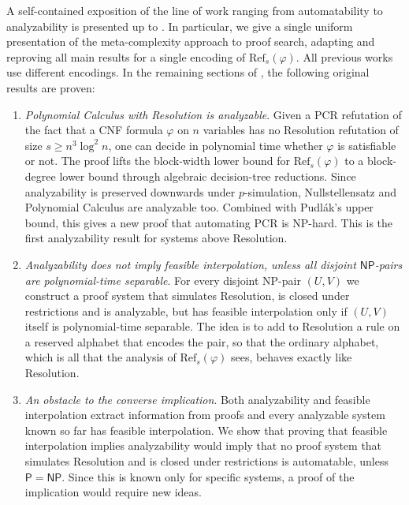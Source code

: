 A self-contained exposition of the line of work ranging from automatability to analyzability is presented up to . In particular, we give a single uniform presentation of the meta-complexity approach to proof search, adapting and reproving all main results for a single encoding of $\mathrm{Ref}_s(\varphi)$. All previous works \cite{res_nphard,alg_nphard,pap,pap_2} use different encodings. In the remaining sections of , the following original results are proven:
\begin{enumerate}
    \item \textit{Polynomial Calculus with Resolution is analyzable}. Given a PCR refutation of the fact that a CNF formula $\varphi$ on $n$ variables has no Resolution refutation of size $s \geq n^3 \log^2 n$, one can decide in polynomial time whether $\varphi$ is satisfiable or not. The proof lifts the block-width lower bound for $\mathrm{Ref}_s(\varphi)$ to a block-degree lower bound through algebraic decision-tree reductions. Since analyzability is preserved downwards under $p$-simulation, Nullstellensatz and Polynomial Calculus are analyzable too. Combined with Pudlák's upper bound, this gives a new proof that automating PCR is $\mathrm{NP}$-hard. This is the first analyzability result for systems above Resolution.
    
    \item \textit{Analyzability does not imply feasible interpolation, unless all disjoint $\mathsf{NP}$-pairs are polynomial-time separable}. For every disjoint $\mathrm{NP}$-pair $(U, V)$ we construct a proof system that simulates Resolution, is closed under restrictions and is analyzable, but has feasible interpolation only if $(U, V)$ itself is polynomial-time separable. The idea is to add to Resolution a rule on a reserved alphabet that encodes the pair, so that the ordinary alphabet, which is all that the analysis of $\mathrm{Ref}_s(\varphi)$ sees, behaves exactly like Resolution.
    \item \textit{An obstacle to the converse implication}. Both analyzability and feasible interpolation extract information from proofs and every analyzable system known so far has feasible interpolation. We show that proving that feasible interpolation implies analyzability would imply that no proof system that simulates Resolution and is closed under restrictions is automatable, unless $\mathsf{P} = \mathsf{NP}$. Since this is known only for specific systems, a proof of the implication would require new ideas.
\end{enumerate}


